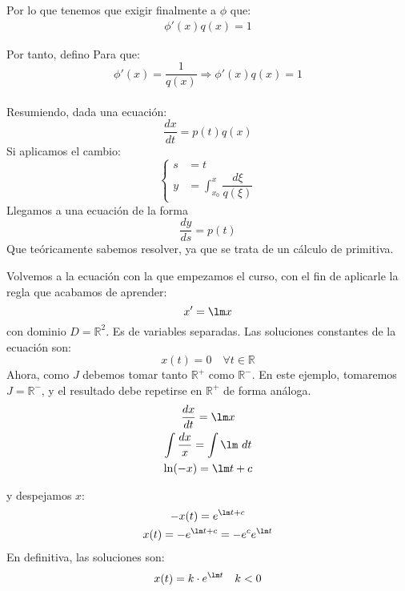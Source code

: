 Por lo que tenemos que exigir finalmente a $\phi$ que:
\begin{gather*}
    \phi'(x) q(x) = 1
\end{gather*}

Por tanto, defino
Para que:
\begin{equation*}
    \phi'(x) = \dfrac{1}{q(x)} \Longrightarrow \phi'(x)q(x) = 1
\end{equation*}~\\
Resumiendo, dada una ecuación:
\begin{equation*}
    \dfrac{dx}{dt} = p(t)q(x)
\end{equation*}
Si aplicamos el cambio:
\begin{equation*}
    \left\{\begin{array}{rl}
            s &= t  \\
            y &= \displaystyle\int_{x_0}^{x} \dfrac{d\xi}{q(\xi)}
    \end{array}\right.
\end{equation*}
Llegamos a una ecuación de la forma
\begin{equation*}
    \dfrac{dy}{ds} = p(t)
\end{equation*}
Que teóricamente sabemos resolver, ya que se trata de un cálculo de primitiva.

\begin{ejemplo}
    Volvemos a la ecuación con la que empezamos el curso, con el fin de aplicarle la regla que acabamos de aprender:
    \begin{equation*}
        x' = \lm x
    \end{equation*}
    con dominio $D=\mathbb{R}^2$. Es de variables separadas. Las soluciones constantes de la ecuación son:
    \begin{equation*}
        x(t) = 0 \quad \forall t\in \mathbb{R}
    \end{equation*}
    Ahora, como $J$ debemos tomar tanto $\mathbb{R}^+$ como $\mathbb{R}^-$. En este ejemplo, tomaremos $J=\mathbb{R}^-$, y el resultado debe repetirse en $\mathbb{R}^+$ de forma análoga.
    \begin{gather*}
        \dfrac{dx}{dt} = \lm x \\
        \int \dfrac{dx}{x} = \int \lm~dt  \\
        \ln(-x) = \lm t + c
    \end{gather*}

    y despejamos $x$:
    \begin{gather*}
        -x(t) = e^{\lm t + c} \\
        x(t) = -e^{\lm t + c} = -e^c e^{\lm t}
    \end{gather*}
    En definitiva, las soluciones son:
    \begin{equation*}
        x(t) = k\cdot e^{\lm t} \quad k<0
    \end{equation*}
\end{ejemplo}

